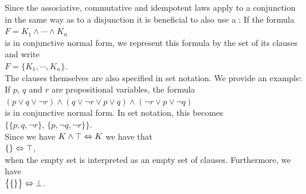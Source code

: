 Since the associative, commutative and idempotent laws apply to a conjunction in the same way as to a
disjunction it is beneficial to also use a
:  If the formula
\\[0.2cm]
\hspace*{1.3cm}
$F = K_1 \wedge \cdots \wedge K_n$
\\[0.2cm]
is in conjunctive normal form, we represent this formula
by the set of its clauses and write \\[0.2cm]
\hspace*{1.3cm} 
$F = \{ K_1, \cdots, K_n \}$. 
\\[0.2cm]
The clauses themselves are also specified in set notation.
We provide an example: If $p$, $q$ and $r$ are propositional variables, the formula 
\\[0.2cm]
\hspace*{1.3cm}
$(p \vee q \vee \neg r) \wedge (q \vee \neg r \vee p \vee q)\wedge (\neg r \vee p \vee \neg q)$
\\[0.2cm]
is in conjunctive normal form.  In set notation, this becomes
\\[0.2cm]
\hspace*{1.3cm}
$\bigl\{ \{p, q, \neg r \},\, \{ p, \neg q, \neg r \} \bigr\}$.
\\[0.2cm]
Since we have $K \wedge \top \Leftrightarrow K$ we have that
\\[0.2cm]
\hspace*{1.3cm}
$\{\} \Leftrightarrow \top$,
\\[0.2cm]
when the empty set is interpreted as an empty set of clauses.  Furthermore, we have
\\[0.2cm]
\hspace*{1.3cm}
$\bigl\{ \{\} \bigr\} \Leftrightarrow \bot$.

